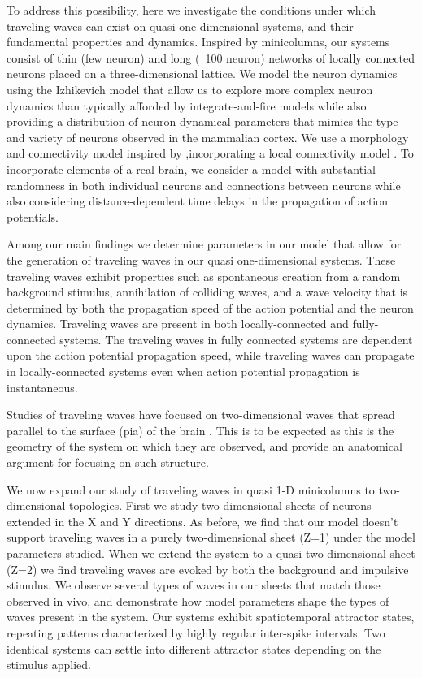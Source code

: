 \documentclass[12pt]{article}
\begin{document}
To address this possibility, here we investigate the conditions under which traveling waves can exist on quasi one-dimensional systems, and their fundamental properties and dynamics.  
Inspired by minicolumns, our systems consist of thin (few neuron) and long (~100 neuron) networks of locally connected neurons placed on a three-dimensional lattice.  
We model the neuron dynamics using the Izhikevich model \parencite{izhikevich2003} that allow us to explore more complex neuron dynamics than typically afforded by integrate-and-fire models \parencite{keane2015}\parencite{Senk2020} while also providing a distribution of neuron dynamical parameters that mimics the type and variety of neurons observed in the mammalian cortex.
We use a morphology and connectivity model inspired by \parencite{maass2002},incorporating a local connectivity model \parencite{Levy2012}\parencite{Pyle2017}\parencite{Fino2011}.
To incorporate elements of a real brain, we consider a model with substantial randomness in both individual neurons and connections between neurons while also considering  distance-dependent time delays in the propagation of action potentials.

Among our main findings we determine parameters in our model that allow for the generation of traveling waves in our quasi one-dimensional systems. 
These traveling waves exhibit properties such as spontaneous creation from a random background stimulus, annihilation of colliding waves, and a wave velocity that is determined by both the propagation speed of the action potential and the neuron dynamics.
Traveling waves are present in both locally-connected and fully-connected systems. 
The traveling waves in fully connected systems are dependent upon the action potential propagation speed, while traveling waves can propagate in locally-connected systems even when action potential propagation is instantaneous.

Studies of traveling waves have focused on two-dimensional waves that spread parallel to the surface (pia) of the brain \parencite{reimer2010}\parencite{keane2015}\parencite{Townsend2018}\parencite{Golomb1997}\parencite{Qi2015}. 
This is to be expected as this is the geometry of the system on which they are observed, and \parencite{Wilson1973} provide an anatomical argument for focusing on such structure. 

We now expand our study of traveling waves in quasi 1-D minicolumns to two-dimensional topologies.
First we study two-dimensional sheets of neurons extended in the X and Y directions.
As before, we find that our model doesn't support traveling waves in a purely two-dimensional sheet (Z=1) under the model parameters studied.
When we extend the system to a quasi two-dimensional sheet (Z=2) we find traveling waves are evoked by both the background and impulsive stimulus.
We observe several types of waves in our sheets that match those observed in vivo, and demonstrate how model parameters shape the types of waves present in the system.
Our systems exhibit spatiotemporal attractor states, repeating patterns characterized by highly regular inter-spike intervals.
Two identical systems can settle into different attractor states depending on the stimulus applied.
\end{document}
